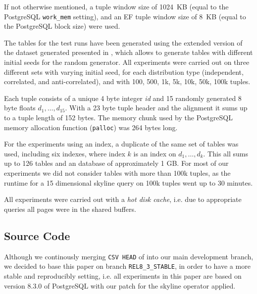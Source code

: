 If not otherwise mentioned, a tuple window size of 1024~KB (equal to
the PostgreSQL \texttt{work\_mem} setting), and an EF tuple window
size of 8~KB (equal to the PostgreSQL block size) were used.

The tables for the test runs have been generated using the extended
version \cite{Eder2007a} of the dataset generated presented in
\cite{Borzsonyi2001}, which allows to generate tables with
different initial seeds for the random generator. All experiments
were carried out on three different sets with varying initial seed, for each
distribution type (independent, correlated, and anti-correlated), and
with 100, 500, 1k, 5k, 10k, 50k, 100k tuples.

Each tuple consists of a unique 4 byte integer \emph{id} and 15
randomly generated 8 byte floats $d_1, \ldots, d_{15}$. With a 23 byte
tuple header and the alignment it sums up to a tuple length of 152 bytes. 
The memory chunk used by the PostgreSQL memory allocation function
(\texttt{palloc}) was 264 bytes long.
%
%
%
%
%

For the experiments using an index, a duplicate of the same set of
tables was used, including six indexes, where index $k$ is an index on
$d_1, \ldots, d_k$. This all sums up to 126 tables and an database of
approximately 1 GB.  
For most of our experiments we did not consider tables with more than
100k tuples, as the runtime for a 15 dimensional skyline query on 100k
tuples went up to 30 minutes.


All experiments were carried out with a \emph{hot disk cache}, i.e. due to
appropriate queries all pages were in the shared buffers.


\subsection{Source Code}
Although we continously merging \texttt{CSV HEAD} of  into our main development branch, we decided
to base this paper on branch \texttt{REL8\_3\_STABLE}, in order to
have a more stable and reproducibly setting, i.e. all experiments in
this paper are based on version 8.3.0 of PostgreSQL with our patch for
the skyline operator applied.

